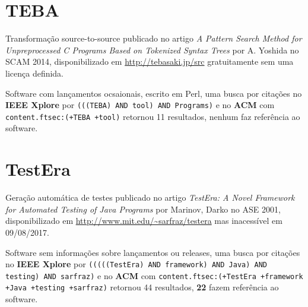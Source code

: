 \section{TEBA}

Transformação source-to-source
publicado no artigo {\it A Pattern Search Method for Unpreprocessed C Programs Based on Tokenized Syntax Trees}
por A. Yoshida
no SCAM 2014,
disponibilizado em \url{http://tebasaki.jp/src}
gratuitamente
sem uma licença definida.

Software com lançamentos ocsaionais,
escrito em Perl,
uma busca por citações no {\bf IEEE Xplore} por
\texttt{(((TEBA) AND tool) AND Programs)}
e no {\bf ACM} com
\texttt{content.ftsec:(+TEBA +tool)}
retornou
11 resultados,
nenhum faz referência ao software.



\section{TestEra}

Geração automática de testes
publicado no artigo {\it TestEra: A Novel Framework for Automated Testing of Java Programs}
por Marinov, Darko
no ASE 2001,
disponibilizado em \url{http://www.mit.edu/~sarfraz/testera}
mas inacessível em 09/08/2017.

Software sem informações sobre lançamentos ou releases,
uma busca por citações no {\bf IEEE Xplore} por
\texttt{(((((TestEra) AND framework) AND Java) AND testing) AND sarfraz)}
e no {\bf ACM} com
\texttt{content.ftsec:(+TestEra +framework +Java +testing +sarfraz)}
retornou
44 resultados,
{\bf 22} fazem referência ao software.


